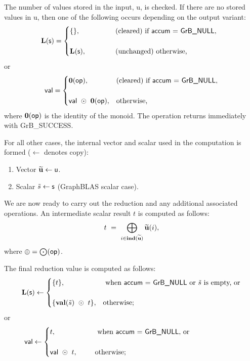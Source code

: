 The number of values stored in the input, {\sf u}, is checked.  If there are no stored values in {\sf u}, then one of the following occurs depending on the output variant:
\[ 
{\sf {\bf L}(s)} =
\begin{cases}
    \{\}, & \mbox{(cleared) if {\sf accum} = {\sf GrB\_NULL}}, ~~\\ & \\
    {\sf {\bf L}(s)}, ~~~ ~~~~~~~ & \mbox{(unchanged) otherwise,}
\end{cases}
\]
or
\[ 
{\sf val} =
\begin{cases}
    \bold{0}({\sf op}), & \mbox{(cleared) if {\sf accum} = {\sf GrB\_NULL}}, \\ & \\
    {\sf val}~\odot~ {\bf 0}({\sf op}), & \mbox{otherwise,}
\end{cases}
\]
where $\bold{0}({\sf op})$ is the identity of the monoid. The operation returns immediately with {\sf GrB\_SUCCESS}.

For all other cases, the internal vector and scalar used in 
the computation is formed ($\leftarrow$ denotes copy):
\begin{enumerate}
	\item Vector ${\bf \widetilde{u}} \leftarrow {\sf u}$.
    \item Scalar ${\tilde{s}} \leftarrow {\sf s}$ (GraphBLAS scalar case).
\end{enumerate}

We are now ready to carry out the reduction and any additional associated operations.  
An intermediate scalar result $t$ is computed as follows:
\[ 
t ~ = ~
    \bigoplus\limits_{i \in \bold{ind}({\bf \widetilde{u}})} {\bf \widetilde{u}}(i),
\]
where $\oplus = \bigodot({\sf op})$.

The final reduction value is computed as follows:
\[
{\sf {\bf L}(s)} \leftarrow
    \begin{cases}
    \{ t \}, & \text{ when {\sf accum = GrB\_NULL} or ${\tilde{s}}$ is empty, or} \\ & \\
    \{ {\bf val}({\tilde{s}}) ~\odot ~ t \}, & \text{otherwise;} \\
    \end{cases}
\]
or 
\[
{\sf val} \leftarrow
    \begin{cases}
    t, & \text{ when {\sf accum = GrB\_NULL}, or} \hspace*{0.95in} \\ & \\
    {\sf val} ~\odot ~t, ~~~~~ & \text{otherwise;} \\
    \end{cases}
\]

